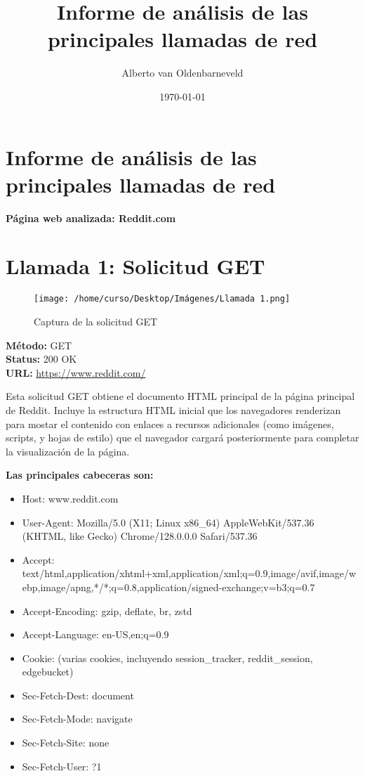 \documentclass[a4paper,12pt]{article}
\title{Informe de análisis de las principales llamadas de red}
\author{Alberto van Oldenbarneveld}
\date{\today}
\begin{document}
\maketitle

\section*{Informe de análisis de las principales llamadas de red}
\textbf{Página web analizada: Reddit.com}

\section*{Llamada 1: Solicitud GET}

\begin{figure}[h!]
    \centering
    \texttt{[image: /home/curso/Desktop/Imágenes/Llamada 1.png]}
    \caption{Captura de la solicitud GET}
\end{figure}

\textbf{Método:} GET \\
\textbf{Status:} 200 OK \\
\textbf{URL:} \url{https://www.reddit.com/}

Esta solicitud GET obtiene el documento HTML principal de la página principal de Reddit. Incluye la estructura HTML inicial que los navegadores renderizan para mostar el contenido con enlaces a recursos adicionales (como imágenes, scripts, y hojas de estilo) que el navegador cargará posteriormente para completar la visualización de la página.

\textbf{Las principales cabeceras son:} 
\begin{itemize}
    \item Host: www.reddit.com
    \item User-Agent: Mozilla/5.0 (X11; Linux x86\_64) AppleWebKit/537.36 (KHTML, like Gecko) Chrome/128.0.0.0 Safari/537.36
    \item Accept: text/html,application/xhtml+xml,application/xml;q=0.9,image/avif,image/webp,image/apng,*/*;q=0.8,application/signed-exchange;v=b3;q=0.7
    \item Accept-Encoding: gzip, deflate, br, zstd
    \item Accept-Language: en-US,en;q=0.9
    \item Cookie: (varias cookies, incluyendo session\_tracker, reddit\_session, edgebucket)
    \item Sec-Fetch-Dest: document
    \item Sec-Fetch-Mode: navigate
    \item Sec-Fetch-Site: none
    \item Sec-Fetch-User: ?1
\end{itemize}
\end{document}
